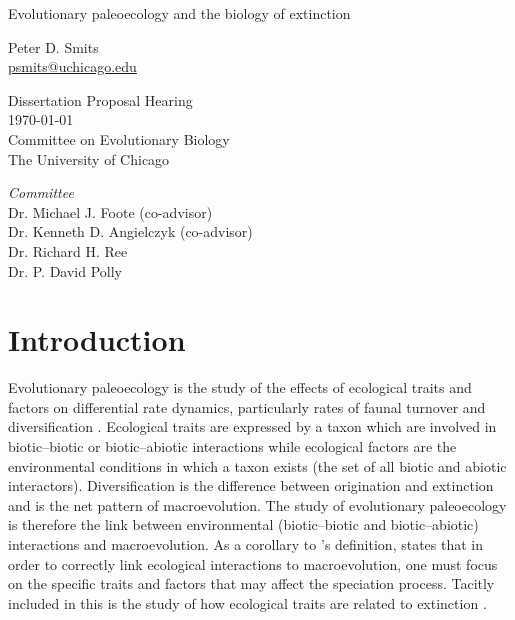 \documentclass[12pt,letterpaper]{article}
\begin{document}
\begin{titlepage}
  \begin{center}
    \huge{Evolutionary paleoecology and the biology of extinction}

    \vspace{1.5cm}

    \large{Peter D. Smits \\}
    \footnotesize{\href{mailto:psmits@uchicago.edu}{psmits@uchicago.edu}}

    \vspace{1.5cm}

    Dissertation Proposal Hearing \\
    \today \\
    Committee on Evolutionary Biology \\
    The University of Chicago

    \vspace{1.5cm}

    \textit{Committee} \\
    Dr. Michael J. Foote (co-advisor) \\
    Dr. Kenneth D. Angielczyk (co-advisor) \\
    Dr. Richard H. Ree \\
    Dr. P. David Polly
  \end{center}
\end{titlepage}

\tableofcontents
\clearpage


\linenumbers
\modulolinenumbers[2]

\section{Introduction} \label{sec:intro}
Evolutionary paleoecology is the study of the effects of ecological traits and factors on differential rate dynamics, particularly rates of faunal turnover and diversification \citep{Kitchell1985a}. Ecological traits are expressed by a taxon which are involved in biotic--biotic or biotic--abiotic interactions while ecological factors are the environmental conditions in which a taxon exists (the set of all biotic and abiotic interactors). Diversification is the difference between origination and extinction and is the net pattern of macroevolution. The study of evolutionary paleoecology is therefore the link between environmental (biotic--biotic and biotic--abiotic) interactions and macroevolution. As a corollary to \citet{Kitchell1985a}'s definition, \citet{Allmon1994} states that in order to correctly link ecological interactions to macroevolution, one must focus on the specific traits and factors that may affect the speciation process. Tacitly included in this is the study of how ecological traits are related to extinction \citep{Kitchell1990}.
\end{document}
